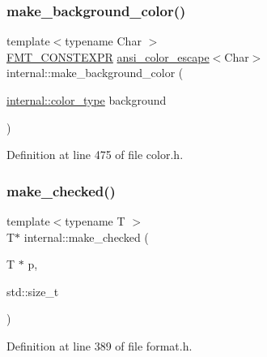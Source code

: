 \subsubsection{\texorpdfstring{make\+\_\+background\+\_\+color()}{make\_background\_color()}}
{\footnotesize\ttfamily template$<$typename Char $>$ \\
\hyperlink{core_8h_a69201cb276383873487bf68b4ef8b4cd}{F\+M\+T\+\_\+\+C\+O\+N\+S\+T\+E\+X\+PR} \hyperlink{structinternal_1_1ansi__color__escape}{ansi\+\_\+color\+\_\+escape}$<$Char$>$ internal\+::make\+\_\+background\+\_\+color (\begin{DoxyParamCaption}\item[{\hyperlink{structinternal_1_1color__type}{internal\+::color\+\_\+type}}]{background }\end{DoxyParamCaption})}



Definition at line 475 of file color.\+h.

\mbox{\label{namespaceinternal_a887ca8a3160ba683e62bd9d7418e821f}} 
\subsubsection{\texorpdfstring{make\+\_\+checked()}{make\_checked()}}
{\footnotesize\ttfamily template$<$typename T $>$ \\
T$\ast$ internal\+::make\+\_\+checked (\begin{DoxyParamCaption}\item[{T $\ast$}]{p,  }\item[{std\+::size\+\_\+t}]{ }\end{DoxyParamCaption})\hspace{0.3cm}{\ttfamily [inline]}}



Definition at line 389 of file format.\+h.

